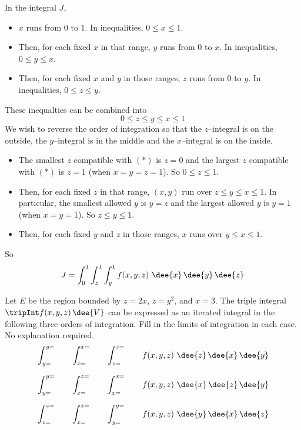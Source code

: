 \begin{solution}
In the integral $J$,
\begin{itemize}
\item
$x$ runs from $0$ to $1$. 
In inequalities, $0\le x\le 1$.
\item
Then, for each fixed $x$ in that range, $y$ runs from $0$ to $x$.
In inequalities, $0\le y\le x$.
\item
Then, for each fixed $x$ and $y$ in those ranges, $z$ runs from $0$ to $y$.
In inequalities, $0\le z\le y$.

\end{itemize}
These inequalties can be combined into 
\begin{equation*}
0\le z\le y\le x\le 1 \tag{$*$}
\end{equation*}
We wish to reverse the order of integration so that the $z$--integral
is on the outside, the $y$--integral is in the middle and the $x$--integral
is on the inside.
\begin{itemize}
\item
The smallest $z$ compatible with $(*)$ is $z=0$
and the largest $z$ compatible with $(*)$ is $z=1$ (when $x=y=z=1$).
So $0\le z\le 1$.
\item
Then, for each fixed $z$ in that range, $(x,y)$ run over 
$z\le y\le x\le 1$. In particular, the smallest allowed $y$ is $y=z$
and the largest allowed $y$ is $y=1$ (when $x=y=1$).
So $z\le y\le 1$.
\item
Then, for each fixed $y$ and $z$ in those ranges, $x$ runs over 
$y\le x\le 1$.
\end{itemize}
So 
\begin{equation*}
J = \int_0^1 \int_z^1\int_y^1 f(x,y,z)\ \dee{x}\,\dee{y}\,\dee{z}
\end{equation*}
\end{solution}


\begin{question}[M200 2014D] %
Let $E$ be the region bounded by $z = 2x$, $z = y^2$, and $x = 3$. 
The triple integral $\tripInt f(x,y,z)\,\dee{V}$ can be expressed 
as an iterated integral in the following three orders
of integration. Fill in the limits of integration in each case. 
No explanation required.
\begin{align*}
&\int_{y=}^{y=}\qquad\int_{x=}^{x=}\qquad\int_{z=}^{z=}\qquad
                f(x,y,z)\ \dee{z}\,\dee{x}\,\dee{y} \\[0.1in]
&\int_{y=}^{y=}\qquad\int_{z=}^{z=}\qquad\int_{x=}^{x=}\qquad
                f(x,y,z)\ \dee{x}\,\dee{z}\,\dee{y} \\[0.1in]
&\int_{z=}^{z=}\qquad\int_{x=}^{x=}\qquad\int_{y=}^{y=}\qquad
                f(x,y,z)\ \dee{y}\,\dee{x}\,\dee{z} 
\end{align*}
\end{question}

